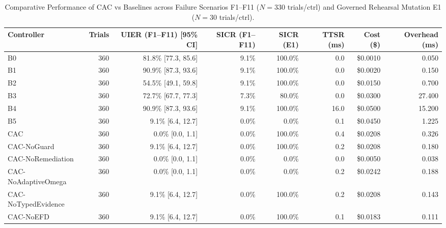 \begin{table}[t]
\centering
\small
\caption{Comparative Performance of CAC vs Baselines across Failure Scenarios F1--F11 ($N=330$ trials/ctrl) and Governed Rehearsal Mutation E1 ($N=30$ trials/ctrl).}
\label{tab:main-results}
\begin{tabular}{lrrrrrrr}
\toprule
\textbf{Controller} & \textbf{Trials} & \textbf{UIER (F1--F11)} [95\% CI] & \textbf{SICR (F1--F11)} & \textbf{SICR (E1)} & \textbf{TTSR (ms)} & \textbf{Cost (\$)} & \textbf{Overhead (ms)} \\
\midrule
B0 & 360 & 81.8\% [77.3, 85.6] & 9.1\% & 100.0\% & 0.0 & \$0.0010 & 0.050 \\
B1 & 360 & 90.9\% [87.3, 93.6] & 9.1\% & 100.0\% & 0.0 & \$0.0020 & 0.150 \\
B2 & 360 & 54.5\% [49.1, 59.8] & 9.1\% & 100.0\% & 0.0 & \$0.0150 & 0.700 \\
B3 & 360 & 72.7\% [67.7, 77.3] & 7.3\% & 80.0\% & 0.0 & \$0.0300 & 27.400 \\
B4 & 360 & 90.9\% [87.3, 93.6] & 9.1\% & 100.0\% & 16.0 & \$0.0500 & 15.200 \\
B5 & 360 & 9.1\% [6.4, 12.7] & 0.0\% & 0.0\% & 0.1 & \$0.0450 & 1.225 \\
CAC & 360 & 0.0\% [0.0, 1.1] & 0.0\% & 100.0\% & 0.4 & \$0.0208 & 0.326 \\
CAC-NoGuard & 360 & 9.1\% [6.4, 12.7] & 0.0\% & 100.0\% & 0.2 & \$0.0208 & 0.180 \\
CAC-NoRemediation & 360 & 0.0\% [0.0, 1.1] & 0.0\% & 0.0\% & 0.0 & \$0.0050 & 0.038 \\
CAC-NoAdaptiveOmega & 360 & 0.0\% [0.0, 1.1] & 0.0\% & 0.0\% & 0.2 & \$0.0242 & 0.188 \\
CAC-NoTypedEvidence & 360 & 9.1\% [6.4, 12.7] & 0.0\% & 100.0\% & 0.2 & \$0.0208 & 0.143 \\
CAC-NoEFD & 360 & 9.1\% [6.4, 12.7] & 0.0\% & 100.0\% & 0.1 & \$0.0183 & 0.111 \\
\bottomrule
\end{tabular}
\end{table}
